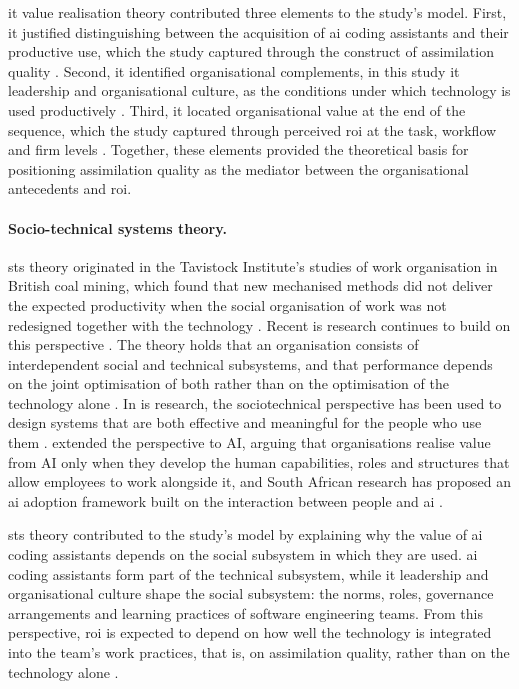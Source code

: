 \gls{it} value realisation theory contributed three elements to the study's model. First, it justified distinguishing between the acquisition of \gls{ai} coding assistants and their productive use, which the study captured through the construct of assimilation quality \parencite{AbdulWahab2024, Uren2023}. Second, it identified organisational complements, in this study \gls{it} leadership and organisational culture, as the conditions under which technology is used productively \parencite{Mikalef2021, Enholm2022}. Third, it located organisational value at the end of the sequence, which the study captured through perceived \gls{roi} at the task, workflow and firm levels \parencite{Enholm2022, Zebec2024}. Together, these elements provided the theoretical basis for positioning assimilation quality as the mediator between the organisational antecedents and \gls{roi}.

\paragraph{Socio-technical systems theory.} \gls{sts} theory originated in the Tavistock Institute's studies of work organisation in British coal mining, which found that new mechanised methods did not deliver the expected productivity when the social organisation of work was not redesigned together with the technology \parencite{Trist1951}. Recent \gls{is} research continues to build on this perspective \parencite{Bednar2020}. The theory holds that an organisation consists of interdependent social and technical subsystems, and that performance depends on the joint optimisation of both rather than on the optimisation of the technology alone \parencite{Bednar2020, Makarius2020}. In \gls{is} research, the sociotechnical perspective has been used to design systems that are both effective and meaningful for the people who use them \parencite{Bednar2020}. \textcite{Makarius2020} extended the perspective to AI, arguing that organisations realise value from AI only when they develop the human capabilities, roles and structures that allow employees to work alongside it, and South African research has proposed an \gls{ai} adoption framework built on the interaction between people and \gls{ai} \parencite{Smit2024}.

\gls{sts} theory contributed to the study's model by explaining why the value of \gls{ai} coding assistants depends on the social subsystem in which they are used. \gls{ai} coding assistants form part of the technical subsystem, while \gls{it} leadership and organisational culture shape the social subsystem: the norms, roles, governance arrangements and learning practices of software engineering teams. From this perspective, \gls{roi} is expected to depend on how well the technology is integrated into the team's work practices, that is, on assimilation quality, rather than on the technology alone \parencite{Bednar2020, Makarius2020, Smit2024}.

